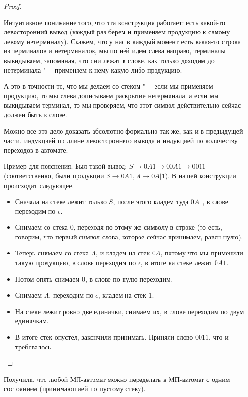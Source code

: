 \begin{proof}
\begin{description}
    Интуитивное понимание того, что эта конструкция работает: есть какой-то левосторонний вывод (каждый раз берем и применяем продукцию к самому левому нетерминалу). 
    Скажем, что у нас в каждый момент есть какая-то строка из терминалов и нетерминалов, мы по ней идем слева направо, терминалы выкидываем, запоминая, что они лежат в слове, 
    как только доходим до нетерминала "--- применяем к нему какую-либо продукцию. 

    А это в точности то, что мы делаем со стеком "--- если мы применяем продукцию, то мы слева дописываем раскрытие нетерминала, а если мы выкидываем терминал, то мы проверяем, что этот символ
    действительно сейчас должен быть в слове.

    Можно все это дело доказать абсолютно формально так же, как и в предыдущей части, индукцией по длине левостороннего вывода и индукцией по количеству переходов в автомате.

    \begin{exmp}       
        Пример для пояснения. Был такой вывод: $S \to 0A1 \to 00A1 \to 0011$ (соответственно, были продукции $S \to 0A1, A \to 0A | 1$).
        В нашей конструкции происходит следующее. 
        \begin{itemize}
        \item Сначала на стеке лежит только $S$, после этого кладем туда $0A1$, в слове переходим по $\epsilon$.
        \item Снимаем со стека $0$, переходя по этому же символу в строке (то есть, говорим, что первый символ слова, которое сейчас принимаем, равен нулю).
        \item Теперь снимаем со стека $A$, и кладем на стек $0A$, потому что мы применили такую продукцию, в слове переходим по $\epsilon$, в итоге на стеке лежит $0A1$.
        \item Потом опять снимаем $0$, в слове по нулю переходим. 
        \item Снимаем $A$, переходим по $\epsilon$, кладем на стек $1$. 
        \item На стеке лежит ровно две единички, снимаем их, в слове переходим по двум единичкам.
        \item В итоге стек опустел, закончили принимать. Приняли слово $0011$, что и требовалось.
        \end{itemize}
    \end{exmp}
\end{description}
\end{proof}          
\begin{conseq}
    Получили, что любой МП-автомат можно переделать в МП-автомат с одним состоянием (принимающией по пустому стеку).
\end{conseq}


